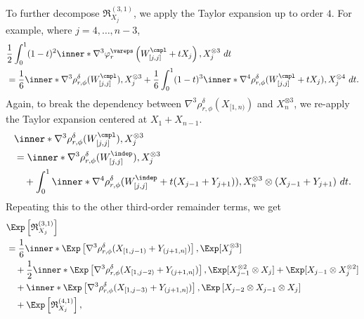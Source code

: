 \documentclass[aos]{imsart}
\begin{document}
\begin{appendix}
To further decompose $\mathfrak{R}_{X_j}^{(3,1)}$, we apply the Taylor expansion up to order $4$. For example, where $j=4,\dots,n-3$, 
\begin{equation*}
\begin{aligned}
    & \frac{1}{2} \int_0^1 (1-t)^2 \inner*{
        \nabla^3 \varphi_r^\vareps\left(
            W^\cmpl_{[j,j]} + t X_j
        \right),
        X_j^{\otimes 3}} ~dt \\
    & = \frac{1}{6} \inner*{ 
        \nabla^3 \rho_{r,\phi}^\delta(W^\cmpl_{[j,j]} ), 
        X_j^{\otimes 3}}
    + \frac{1}{6} \int_0^1 (1-t)^3 \inner*{
    \nabla^4 \rho_{r,\phi}^\delta(W^\cmpl_{[j,j]}  + t X_j), X_j^{\otimes 4}} ~dt.
\end{aligned}
\end{equation*}
Again, to break the dependency between $\nabla^3 \rho_{r,\phi}^\delta(X_{[1,n)})$ and $X_n^{\otimes 3}$, we re-apply the Taylor expansion centered at $X_1 + X_{n-1}$.
\begin{equation*}
\begin{aligned}
    & \inner*{ \nabla^3 \rho_{r,\phi}^\delta(W^\cmpl_{[j,j]}), X_j^{\otimes 3}} \\
    & = \inner*{ \nabla^3 \rho_{r,\phi}^\delta(W^\indep_{[j,j]}), X_j^{\otimes 3}} \\
    & \quad + \int_0^1 \inner*{
    \nabla^4 \rho_{r,\phi}^\delta(W^\indep_{[j,j]} + t (X_{j-1}+Y_{j+1})), X_n^{\otimes 3} \otimes (X_{j-1}+Y_{j+1})} ~dt.
\end{aligned}
\end{equation*}
Repeating this to the other third-order remainder terms, we get
\begin{equation*}
\begin{aligned}
    & \Exp\left[ \mathfrak{R}_{X_j}^{(3,1)} \right] \\
    & = \frac{1}{6} 
        \inner*{ \Exp\left[ \nabla^3 \rho_{r,\phi}^\delta(X_{[1,j-1)} + Y_{(j+1,n]}) \right], \Exp[ X_j^{\otimes 3} ]} \\
    & \quad + \frac{1}{2} \inner*{ 
        \Exp\left[ \nabla^3 \rho_{r,\phi}^\delta(X_{[1,j-2)} + Y_{(j+1,n]}) \right], 
        \Exp[ X_{j-1}^{\otimes 2} \otimes X_j ] + \Exp[ X_{j-1} \otimes X_j^{\otimes 2}]} \\
    & \quad + \inner*{ 
        \Exp\left[ \nabla^3 \rho_{r,\phi}^\delta(X_{[1,j-3)} + Y_{(j+1,n]}) \right], 
        \Exp\left[ X_{j-2} \otimes X_{j-1} \otimes X_{j} \right]} \\
    & \quad + \Exp\left[ \mathfrak{R}_{X_j}^{(4,1)} \right],
\end{aligned}

\end{equation*}
\end{appendix}
\end{document}

